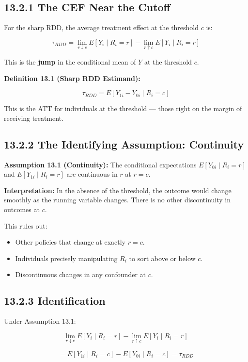 \subsection{13.2.1 The CEF Near the Cutoff}

For the sharp RDD, the average treatment effect at the threshold $c$ is:

\[
\tau_{RDD} = \lim_{r \downarrow c} E[Y_i \mid R_i = r] - \lim_{r \uparrow c} E[Y_i \mid R_i = r]
\]

This is the \textbf{jump} in the conditional mean of $Y$ at the threshold $c$.

\textbf{Definition 13.1 (Sharp RDD Estimand):} 

\[
\tau_{RDD} = E[Y_{1i} - Y_{0i} \mid R_i = c]
\]

This is the ATT for individuals at the threshold --- those right on the margin of receiving treatment.

\subsection{13.2.2 The Identifying Assumption: Continuity}

\textbf{Assumption 13.1 (Continuity):} The conditional expectations $E[Y_{0i} \mid R_i = r]$ and $E[Y_{1i} \mid R_i = r]$ are continuous in $r$ at $r = c$.

\textbf{Interpretation:} In the absence of the threshold, the outcome would change smoothly as the running variable changes. There is no other discontinuity in outcomes at $c$.

This rules out:
\begin{itemize}
\item Other policies that change at exactly $r = c$.
\item Individuals precisely manipulating $R_i$ to sort above or below $c$.
\item Discontinuous changes in any confounder at $c$.
\end{itemize}

\subsection{13.2.3 Identification}

Under Assumption 13.1:

\[
\lim_{r \downarrow c} E[Y_i \mid R_i = r] - \lim_{r \uparrow c} E[Y_i \mid R_i = r]
\]

\[
= E[Y_{1i} \mid R_i = c] - E[Y_{0i} \mid R_i = c] = \tau_{RDD}
\]

